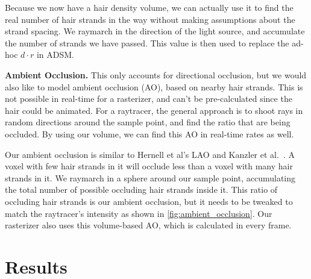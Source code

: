 \documentclass{egpubl}
\begin{document}

Because we now have a hair density volume, we can actually use it to find the real number of hair strands in the way without making assumptions about the strand spacing. We raymarch in the direction of the light source, and accumulate the number of strands we have passed. This value is then used to replace the ad-hoc $d \cdot r$ in ADSM.


\noindent \textbf{Ambient Occlusion. } This only accounts for directional occlusion, but we would also like to model ambient occlusion (AO), based on nearby hair strands. This is not possible in real-time for a rasterizer, and can't be pre-calculated since the hair could be animated. For a raytracer, the general approach is to shoot rays in random directions around the sample point, and find the ratio that are being occluded. By using our volume, we can find this AO in real-time rates as well.

Our ambient occlusion is similar to Hernell et al's LAO \cite{hernell2010local} and Kanzler et al.~\cite{kanzler2018voxel}. A voxel with few hair strands in it will occlude less than a voxel with many hair strands in it. We raymarch in a sphere around our sample point, accumulating the total number of possible occluding hair strands inside it. This ratio of occluding hair strands is our ambient occlusion, but it needs to be tweaked to match the raytracer's intensity as shown in \cref{fig:ambient_occlusion}. Our rasterizer also uses this volume-based AO, which is calculated in every frame.

\section{Results} \label{sec:results}
\end{document}
